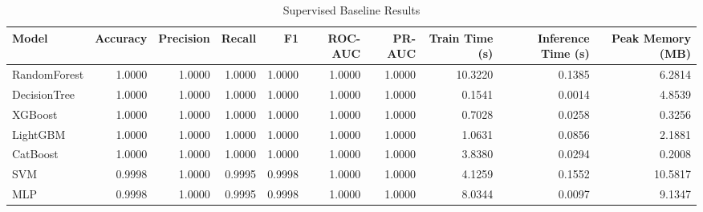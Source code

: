 \begin{table}
\caption{Supervised Baseline Results}
\label{tab:supervised_baseline_results}
\begin{tabular}{lrrrrrrrrr}
\toprule
Model & Accuracy & Precision & Recall & F1 & ROC-AUC & PR-AUC & Train Time (s) & Inference Time (s) & Peak Memory (MB) \\
\midrule
RandomForest & 1.0000 & 1.0000 & 1.0000 & 1.0000 & 1.0000 & 1.0000 & 10.3220 & 0.1385 & 6.2814 \\
DecisionTree & 1.0000 & 1.0000 & 1.0000 & 1.0000 & 1.0000 & 1.0000 & 0.1541 & 0.0014 & 4.8539 \\
XGBoost & 1.0000 & 1.0000 & 1.0000 & 1.0000 & 1.0000 & 1.0000 & 0.7028 & 0.0258 & 0.3256 \\
LightGBM & 1.0000 & 1.0000 & 1.0000 & 1.0000 & 1.0000 & 1.0000 & 1.0631 & 0.0856 & 2.1881 \\
CatBoost & 1.0000 & 1.0000 & 1.0000 & 1.0000 & 1.0000 & 1.0000 & 3.8380 & 0.0294 & 0.2008 \\
SVM & 0.9998 & 1.0000 & 0.9995 & 0.9998 & 1.0000 & 1.0000 & 4.1259 & 0.1552 & 10.5817 \\
MLP & 0.9998 & 1.0000 & 0.9995 & 0.9998 & 1.0000 & 1.0000 & 8.0344 & 0.0097 & 9.1347 \\
\bottomrule
\end{tabular}
\end{table}
